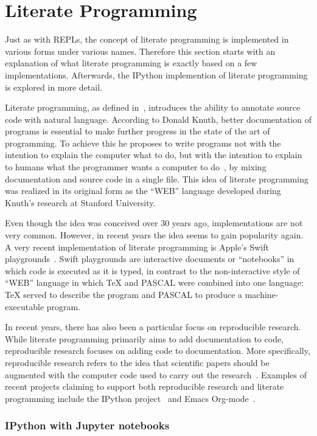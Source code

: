\section{Literate Programming}
\label{sec:literate-programming}
Just as with REPLs, the concept of literate programming is implemented in
various forms under various names. Therefore this section starts with an
explanation of what literate programming is exactly based on a few
implementations. Afterwards, the IPython implemention of literate programming is
explored in more detail.

Literate programming, as defined in~\cite{knuth1984}, introduces the ability to
annotate source code with natural language. According to Donald Knuth, better
documentation of programs is essential to make further progress in the state of
the art of programming.  To achieve this he proposes to write programs not with
the intention to explain the computer what to do, but with the intention to
explain to humans what the programmer wants a computer to do~\cite{knuth1984},
by mixing documentation and source code in a single file. This idea of
literate programming was realized in its original form as the ``WEB'' language
developed during Knuth's research at Stanford University.

Even though the idea was conceived over 30 years ago, implementations are not
very common. However, in recent years the idea seems to gain popularity again.
A very recent implementation of literate programming is Apple's Swift
playgrounds~\cite{swift-playgrounds}. Swift playgrounds are interactive
documents or ``notebooks'' in which code is executed as it is typed, in
contrast to the non-interactive style of ``WEB'' language in which \TeX{} and
PASCAL were combined into one language: \TeX{} served to describe the program
and PASCAL to produce a machine-executable program.

In recent years, there has also been a particular focus on reproducible
research. While literate programming primarily aims to add documentation to
code, reproducible research focuses on adding code to documentation. More
specifically, reproducible research refers to the idea that scientific papers
should be augmented with the computer code used to carry out the
research~\cite{schulte2012}. Examples of recent projects claiming to support
both reproducible research and literate programming include the IPython
project~\cite{ipython2007} and Emacs Org-mode~\cite{schulte2012}.

\subsubsection{IPython with Jupyter notebooks}

